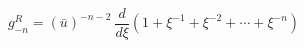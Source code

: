 \begin{equation}
g_{-n}^{R}= (\bar{u})^{-n-2}~\frac{d}{d\xi} (1+\xi^{-1}+\xi^{-2} + \cdots+\xi^{-n})
\label{212}
\end{equation}

